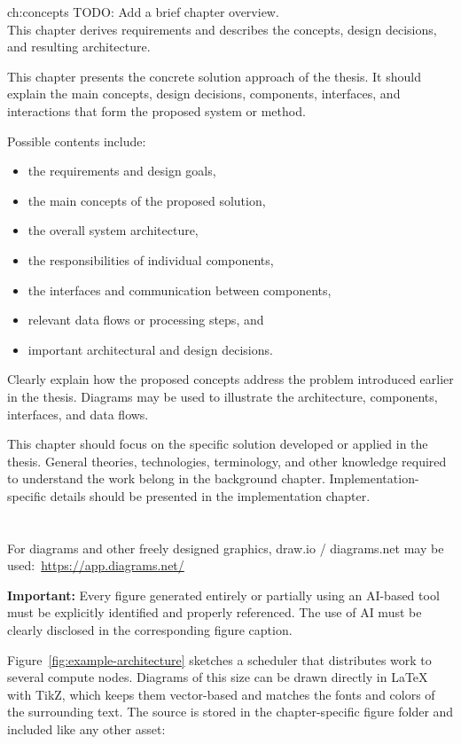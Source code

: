 \ThesisChapter
  {}
  {ch:concepts}
  {TODO: Add a brief chapter overview. \\
  This chapter derives requirements and describes the concepts, design decisions, and resulting architecture.}


This chapter presents the concrete solution approach of the thesis.
It should explain the main concepts, design decisions, components, interfaces, and interactions that form the proposed system or method.

Possible contents include:
\begin{itemize}
  \item the requirements and design goals,
  \item the main concepts of the proposed solution,
  \item the overall system architecture,
  \item the responsibilities of individual components,
  \item the interfaces and communication between components,
  \item relevant data flows or processing steps, and
  \item important architectural and design decisions.
\end{itemize}

Clearly explain how the proposed concepts address the problem introduced earlier in the thesis.
Diagrams may be used to illustrate the architecture, components, interfaces, and data flows.

This chapter should focus on the specific solution developed or applied in the thesis.
General theories, technologies, terminology, and other knowledge required to understand the work belong in the background chapter.
Implementation-specific details should be presented in the implementation chapter.

\section{}
\label{sec:example-architecture-diagram}

For diagrams and other freely designed graphics, draw.io / diagrams.net may be used:~\url{https://app.diagrams.net/}

\textbf{Important:} Every figure generated entirely or partially using an AI-based tool must be explicitly identified and properly referenced.
The use of AI must be clearly disclosed in the corresponding figure caption.

Figure~\ref{fig:example-architecture} sketches a scheduler that distributes work to several compute nodes.
Diagrams of this size can be drawn directly in LaTeX with TikZ, which keeps them vector-based and matches the fonts and colors of the surrounding text.
The source is stored in the chapter-specific figure folder and included like any other asset:


